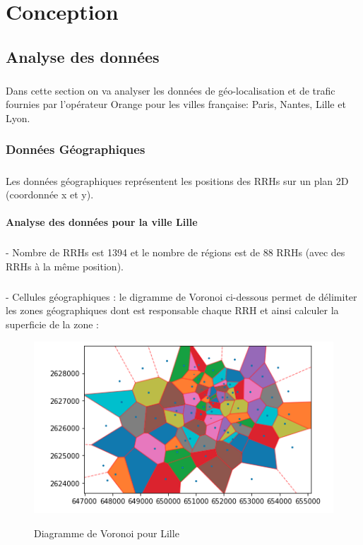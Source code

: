 \documentclass{report}
\begin{document}
\chapter{Conception}
\section{Analyse des données}
\paragraph{}
Dans cette section on va analyser les données de géo-localisation et de trafic fournies par l'opérateur Orange pour les villes française: Paris, Nantes, Lille et Lyon.
\subsection{Données Géographiques}
\paragraph{}
Les données géographiques représentent les positions des RRHs sur un plan 2D (coordonnée x et y).\\
\subsubsection{Analyse des données pour la ville Lille}
\paragraph{}
- Nombre de RRHs est 1394 et le nombre de régions est de 88 RRHs (avec des RRHs à la même position).\\
\paragraph{}
- Cellules géographiques : le digramme de Voronoi ci-dessous permet de délimiter les zones géographiques dont est responsable chaque RRH et ainsi calculer la superficie de la zone :\\
\begin{figure}[H]
\begin{center}
  \includegraphics[scale=0.6]{images/voronoi-areas.png}\\
  \caption{Diagramme de Voronoi pour Lille}   
  \label{fig:picture}
\end{center}
\end{figure}
\end{document}
